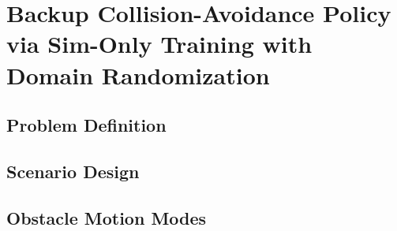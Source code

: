 
\chapter{Backup Collision-Avoidance Policy via Sim-Only Training with Domain Randomization}\label{ch:backup_policy}

\section{Problem Definition}\label{sec:backup_problem}

%

\section{Scenario Design}\label{sec:scenarios}

%
%
%

\section{Obstacle Motion Modes}\label{sec:motion_modes}

%
%
%
%
%

